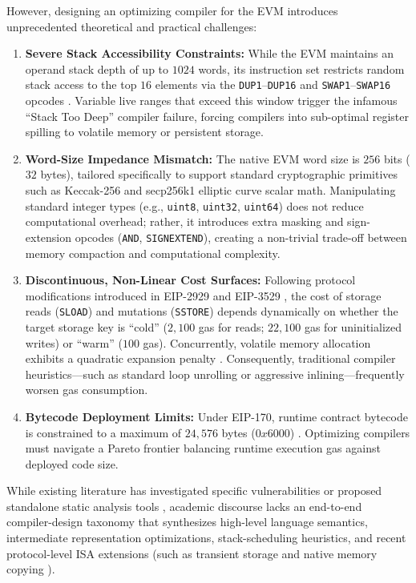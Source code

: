 \documentclass[conference]{IEEEtran}
\begin{document}
However, designing an optimizing compiler for the EVM introduces unprecedented theoretical and practical challenges:
\begin{enumerate}
    \item \textbf{Severe Stack Accessibility Constraints:} While the EVM maintains an operand stack depth of up to $1024$ words, its instruction set restricts random stack access to the top $16$ elements via the \texttt{DUP1}--\texttt{DUP16} and \texttt{SWAP1}--\texttt{SWAP16} opcodes \cite{wood2014ethereum}. Variable live ranges that exceed this window trigger the infamous ``Stack Too Deep'' compiler failure, forcing compilers into sub-optimal register spilling to volatile memory or persistent storage.
    \item \textbf{Word-Size Impedance Mismatch:} The native EVM word size is $256$ bits ($32$ bytes), tailored specifically to support standard cryptographic primitives such as Keccak-256 and secp256k1 elliptic curve scalar math. Manipulating standard integer types (e.g., \texttt{uint8}, \texttt{uint32}, \texttt{uint64}) does not reduce computational overhead; rather, it introduces extra masking and sign-extension opcodes (\texttt{AND}, \texttt{SIGNEXTEND}), creating a non-trivial trade-off between memory compaction and computational complexity.
    \item \textbf{Discontinuous, Non-Linear Cost Surfaces:} Following protocol modifications introduced in EIP-2929 \cite{eip2929} and EIP-3529 \cite{eip3529}, the cost of storage reads (\texttt{SLOAD}) and mutations (\texttt{SSTORE}) depends dynamically on whether the target storage key is ``cold'' ($2,100$ gas for reads; $22,100$ gas for uninitialized writes) or ``warm'' ($100$ gas). Concurrently, volatile memory allocation exhibits a quadratic expansion penalty \cite{wood2014ethereum}. Consequently, traditional compiler heuristics---such as standard loop unrolling or aggressive inlining---frequently worsen gas consumption.
    \item \textbf{Bytecode Deployment Limits:} Under EIP-170, runtime contract bytecode is constrained to a maximum of $24,576$ bytes ($0x6000$) \cite{eip170}. Optimizing compilers must navigate a Pareto frontier balancing runtime execution gas against deployed code size.
\end{enumerate}

While existing literature has investigated specific vulnerabilities \cite{chen2017under, luu2016making} or proposed standalone static analysis tools \cite{albert2018ethir, albert2020gasol}, academic discourse lacks an end-to-end compiler-design taxonomy that synthesizes high-level language semantics, intermediate representation optimizations, stack-scheduling heuristics, and recent protocol-level ISA extensions (such as transient storage \cite{eip1153} and native memory copying \cite{eip5656}).
\end{document}
